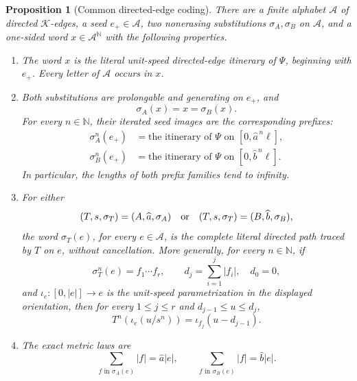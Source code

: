 \documentclass[11pt]{article}
\newtheorem{proposition}[theorem]{Proposition}
\theoremstyle{definition}
\theoremstyle{remark}
\begin{document}
\begin{proposition}[Common directed-edge coding]
\label{term:prop:common-edge-coding}
There are a finite alphabet \(\mathcal A\) of directed
\(\mathcal K\)-edges, a seed \(e_+\in\mathcal A\), two nonerasing
substitutions \(\sigma_A,\sigma_B\) on \(\mathcal A\), and a one-sided word
\(x\in\mathcal A^{\mathbb N}\) with the following properties.
\begin{enumerate}
\item The word \(x\) is the literal unit-speed directed-edge itinerary of
\(\Psi\), beginning with \(e_+\).  Every letter of \(\mathcal A\) occurs
in \(x\).
\item Both substitutions are prolongable and generating on \(e_+\), and
\begin{equation}\label{term:eq:common-fixed-word}
 \sigma_A(x)=x=\sigma_B(x).
\end{equation}
For every \(n\in\mathbb N\), their iterated seed images are the corresponding
prefixes:
\begin{equation}\label{term:eq:substitution-prefixes}
\begin{split}
 \sigma_A^n(e_+)
 &=\text{the itinerary of }\Psi\text{ on }[0,\widehat a^{\,n}\ell],\\
 \sigma_B^n(e_+)
 &=\text{the itinerary of }\Psi\text{ on }[0,\widehat b^{\,n}\ell].
\end{split}
\end{equation}
In particular, the lengths of both prefix families tend to infinity.
\item For either
\[
 (T,s,\sigma_T)=(A,\widehat a,\sigma_A)
 \quad\hbox{or}\quad
 (T,s,\sigma_T)=(B,\widehat b,\sigma_B),
\]
the word \(\sigma_T(e)\), for every \(e\in\mathcal A\), is the complete
literal directed path traced by \(T\) on \(e\), without cancellation.  More
generally, for every \(n\in\mathbb N\), if
\[
 \sigma_T^n(e)=f_1\cdots f_r,\qquad
 d_j=\sum_{i=1}^j |f_i|,\quad d_0=0,
\]
and \(\iota_e:[0,|e|]\to e\) is the unit-speed parametrization in the
displayed orientation, then for every \(1\leq j\leq r\) and
\(d_{j-1}\leq u\leq d_j\),
\begin{equation}\label{term:eq:ordered-edge-realization}
 T^n\!\left(\iota_e(u/s^n)\right)
   =\iota_{f_j}(u-d_{j-1}).
\end{equation}
\item The exact metric laws are
\begin{equation}\label{term:eq:metric-substitution}
 \sum_{f\text{ in }\sigma_A(e)}|f|=\widehat a|e|,
 \qquad
 \sum_{f\text{ in }\sigma_B(e)}|f|=\widehat b|e|.
\end{equation}
\end{enumerate}
\end{proposition}
\end{document}
